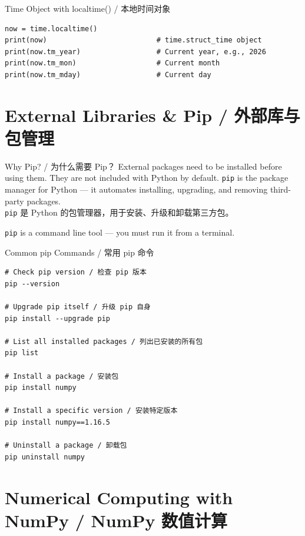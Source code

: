\documentclass[11pt,a4paper]{report}
\let\oldtexttt\texttt
\renewcommand{\texttt}[1]{\textcolor{mainblue}{\oldtexttt{#1}}}
\begin{document}
\begin{examplebox}{Time Object with localtime() / 本地时间对象}
\begin{lstlisting}
now = time.localtime()
print(now)                          # time.struct_time object
print(now.tm_year)                  # Current year, e.g., 2026
print(now.tm_mon)                   # Current month
print(now.tm_mday)                  # Current day
\end{lstlisting}
\end{examplebox}

\section{External Libraries \& Pip / 外部库与包管理}

\begin{concept}{Why Pip? / 为什么需要 Pip？}
    External packages need to be installed before using them. They are not included with Python by default. \texttt{pip} is the package manager for Python — it automates installing, upgrading, and removing third-party packages. \\
    \texttt{pip} 是 Python 的包管理器，用于安装、升级和卸载第三方包。

    \texttt{pip} is a command line tool — you must run it from a terminal.
\end{concept}

\begin{examplebox}{Common pip Commands / 常用 pip 命令}
\begin{lstlisting}
# Check pip version / 检查 pip 版本
pip --version

# Upgrade pip itself / 升级 pip 自身
pip install --upgrade pip

# List all installed packages / 列出已安装的所有包
pip list

# Install a package / 安装包
pip install numpy

# Install a specific version / 安装特定版本
pip install numpy==1.16.5

# Uninstall a package / 卸载包
pip uninstall numpy
\end{lstlisting}
\end{examplebox}

\section{Numerical Computing with NumPy / NumPy 数值计算}
\end{document}
